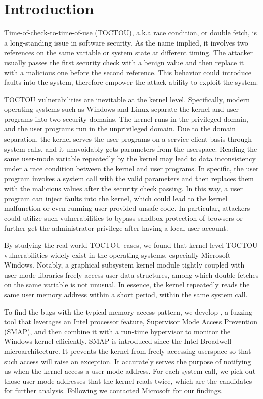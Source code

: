 
\section{Introduction}
\label{sec:ktoctou-introduction}

Time-of-check-to-time-of-use (TOCTOU), a.k.a race condition, or double fetch, is a long-standing issue in software security. As the name implied, it involves two references on the same variable or system state at different timing. The attacker usually passes the first security check with a benign value and then replace it with a malicious one before the second reference. This behavior could introduce faults into the system, therefore empower the attack ability to exploit the system.

TOCTOU vulnerabilities are inevitable at the kernel level. Specifically, modern operating systems such as Windows and Linux separate the kernel and user programs into two security domains. The kernel runs in the privileged domain, and the user programs run in the unprivileged domain. Due to the domain separation, the kernel serves the user programs on a service-client basis through system calls, and it unavoidably gets parameters from the userspace. Reading the same user-mode variable repeatedly by the kernel may lead to data inconsistency under a race condition between the kernel and user programs. In specific, the user program invokes a system call with the valid parameters and then replaces them with the malicious values after the security check passing. In this way, a user program can inject faults into the kernel, which could lead to the kernel malfunction or even running user-provided unsafe code. In particular, attackers could utilize such vulnerabilities to bypass sandbox protection of browsers or further get the administrator privilege after having a local user account.

By studying the real-world TOCTOU cases,  we found that kernel-level TOCTOU vulnerabilities widely exist in the operating systems, especially Microsoft Windows. Notably, a graphical subsystem kernel module tightly coupled with user-mode libraries freely access user data structures, among which double fetches on the same variable is not unusual. In essence, the kernel repeatedly reads the same user memory address within a short period, within the same system call.

To find the bugs with the typical memory-access pattern, we develop \toolname, a fuzzing tool that leverages an Intel processor feature, Supervisor Mode Access Prevention (SMAP), and then combine it with a run-time hypervisor to monitor the Windows kernel efficiently. SMAP is introduced since the Intel Broadwell microarchitecture. It prevents the kernel from freely accessing userspace so that such access will raise an exception. It accurately serves the purpose of notifying us when the kernel access a user-mode address. For each system call, we pick out those user-mode addresses that the kernel reads twice, which are the candidates for further analysis. Following we contacted Microsoft for our findings.

